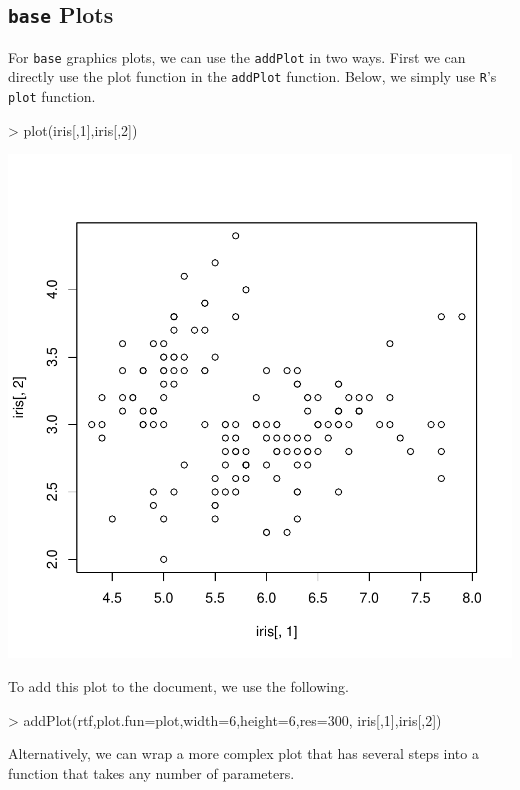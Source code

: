 \documentclass[11pt,letterpaper]{article}
\begin{document}
\subsection{\texttt{base} Plots}
For \texttt{base} graphics plots, we can use the \texttt{addPlot} in two ways.  First we can directly use the plot function in the \texttt{addPlot} function.  Below, we simply use \texttt{R}'s \texttt{plot} function.

\begin{Schunk}
\begin{Sinput}
> plot(iris[,1],iris[,2])
\end{Sinput}
\end{Schunk}
\includegraphics{rtf-019}

To add this plot to the document, we use the following.

\begin{Schunk}
\begin{Sinput}
> addPlot(rtf,plot.fun=plot,width=6,height=6,res=300, iris[,1],iris[,2])
\end{Sinput}
\end{Schunk}

Alternatively, we can wrap a more complex plot that has several steps into a function that takes any number of parameters.
\end{document}
